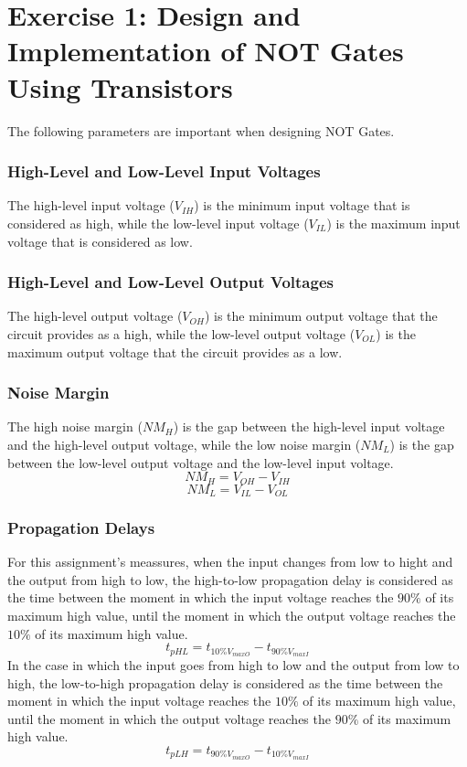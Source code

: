 \documentclass[a4paper,11pt]{report}
\begin{document}
\section{\color{olive}Exercise 1: Design and Implementation of NOT Gates Using Transistors} %

The following parameters are important when designing NOT Gates.

\subsubsection{\color{red}High-Level and Low-Level Input Voltages}
The high-level input voltage ($V_{IH}$) is the minimum input voltage that is considered as high, while the low-level input voltage ($V_{IL}$)  is the maximum input voltage that is considered as low.

\subsubsection{\color{red}High-Level and Low-Level Output Voltages}
The high-level output voltage ($V_{OH}$) is the minimum output voltage that the circuit provides as a high, while the low-level output voltage ($V_{OL}$) is the maximum output voltage that the circuit provides as a low.

\subsubsection{\color{red}Noise Margin}
The high noise margin ($NM_{H}$) is the gap between the high-level input voltage and the high-level output voltage, while the low noise margin ($NM_{L}$) is the gap between the low-level output voltage and the low-level input voltage.
$$NM_{H} = V_{OH} - V_{IH}$$
$$NM_{L} = V_{IL} - V_{OL}$$

\subsubsection{\color{red}Propagation Delays}
For this assignment's meassures, when the input changes from low to hight and the output from high to low, the high-to-low propagation delay is considered as the time between the moment in which the input voltage reaches the $90\% $ of its maximum high value, until the moment in which the output voltage reaches the $10\%$ of its maximum high value.
$$t_{pHL} = t_{10\%V_{maxO}} - t_{90\%V_{maxI}}$$
In the case in which the input goes from high to low and the output from low to high, the low-to-high propagation delay is considered as the time between the moment in which the input voltage reaches the $10\%$ of its maximum high value, until the moment in which the output voltage reaches the $90\%$ of its maximum high value.
$$t_{pLH} = t_{90\%V_{maxO}} - t_{10\%V_{maxI}}$$
\end{document}
